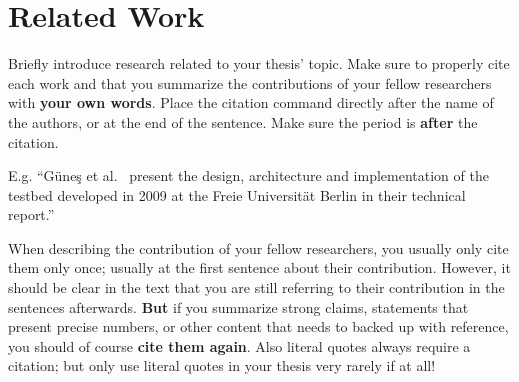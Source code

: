 \chapter{Related Work}
\label{cha:related_work}

Briefly introduce research related to your thesis' topic.
Make sure to properly cite each work and that you summarize the contributions of your fellow researchers with \textbf{your own words}.
Place the citation command directly after the name of the authors, or at the end of the sentence.
Make sure the period is \textbf{after} the citation.

E.g. ``Güne\c{s} et al.~\cite{Guenes+:2008TR} present the design, architecture and implementation of the testbed developed in 2009 at the Freie Universität Berlin in their technical report.''

When describing the contribution of your fellow researchers, you usually only cite them only once; usually at the first sentence about their contribution.
However, it should be clear in the text that you are still referring to their contribution in the sentences afterwards.
\textbf{But} if you summarize strong claims, statements that present precise numbers, or other content that needs to backed up with reference, you should of course \textbf{cite them again}.
Also literal quotes always require a citation; but only use literal quotes in your thesis very rarely if at all!
